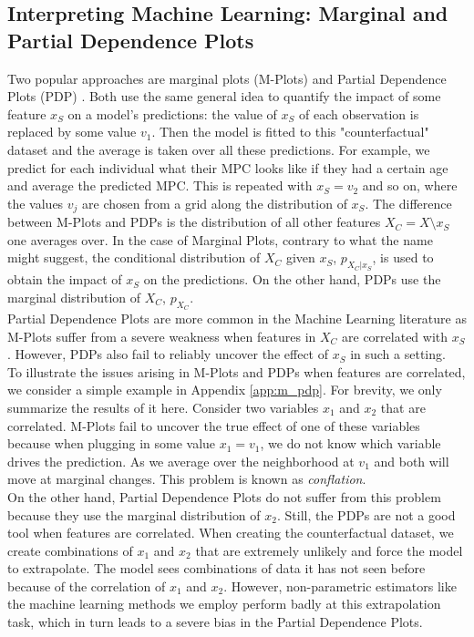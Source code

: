 \subsection{Interpreting Machine Learning: Marginal and Partial Dependence Plots} \label{subsec:m_pdp}
Two popular approaches are marginal plots (M-Plots) \citep{molnar_2019} and Partial Dependence Plots (PDP) \citep{friedman_2001}. Both use the same general idea to quantify the impact of some feature $x_S$ on a model's predictions: the value of $x_S$ of each observation is replaced by some value $v_1$. Then the model is fitted to this "counterfactual" dataset and the average is taken over all these predictions. For example, we predict for each individual what their MPC looks like if they had a certain age and average the predicted MPC. This is repeated with $x_S=v_2$ and so on, where the values $v_j$ are chosen from a grid along the distribution of $x_S$. The difference between M-Plots and PDPs is the distribution of all other features $X_C=X\setminus x_S$ one averages over. In the case of Marginal Plots, contrary to what the name might suggest, the conditional distribution of $X_C$ given $x_S$, $p_{X_C|x_S}$, is used to obtain the impact of $x_S$ on the predictions. On the other hand, PDPs use the marginal distribution of $X_C$, $p_{X_C}$. \\
Partial Dependence Plots are more common in the Machine Learning literature as M-Plots suffer from a severe weakness when features in $X_C$ are correlated with $x_S$. However, PDPs also fail to reliably uncover the effect of $x_S$ in such a setting. \\
To illustrate the issues arising in M-Plots and PDPs when features are correlated, we consider a simple example in Appendix \ref{app:m_pdp}. For brevity, we only summarize the results of it here. Consider two variables $x_1$ and $x_2$ that are correlated. M-Plots fail to uncover the true effect of one of these variables because when plugging in some value $x_1=v_1$, we do not know which variable drives the prediction. As we average over the neighborhood at $v_1$ and both will move at marginal changes. This problem is known as \textit{conflation}. \\
On the other hand, Partial Dependence Plots do not suffer from this problem because they use the marginal distribution of $x_2$. 
Still, the PDPs are not a good tool when features are correlated. When creating the counterfactual dataset, we create combinations of $x_1$ and $x_2$ that are extremely unlikely and force the model to extrapolate. The model sees combinations of data it has not seen before because of the correlation of $x_1$ and $x_2$. However, non-parametric estimators like the machine learning methods we employ perform badly at this extrapolation task, which in turn leads to a severe bias in the Partial Dependence Plots. \citep{apleyzhu_2020} \\
